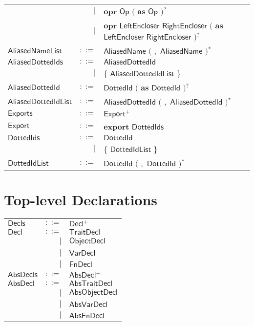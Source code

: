 \begin{longtable}[l]{p{3cm}rl}
 & $\big|$ &  $\mathbf{opr}$ $\mathsf{Op}$ $\big($  $\mathbf{as}$ $\mathsf{Op}$ $\big)$$^?$ \\
 & $\big|$ &  $\mathbf{opr}$ $\mathsf{LeftEncloser}$ $\mathsf{RightEncloser}$ $\big($  $\mathbf{as}$ $\mathsf{LeftEncloser}$ $\mathsf{RightEncloser}$ $\big)$$^?$ \\
$\mathsf{AliasedNameList}$ &  $\mathsf{::=}$  & $\mathsf{AliasedName}$ $\big($  $\mathbf{,}$ $\mathsf{AliasedName}$ $\big)$$^*$ \\
$\mathsf{AliasedDottedIds}$ &  $\mathsf{::=}$  & $\mathsf{AliasedDottedId}$ \\
 & $\big|$ &  $\mathbf{\{}$ $\mathsf{AliasedDottedIdList}$ $\mathbf{\}}$ \\
$\mathsf{AliasedDottedId}$ &  $\mathsf{::=}$  & $\mathsf{DottedId}$ $\big($  $\mathbf{as}$ $\mathsf{DottedId}$ $\big)$$^?$ \\
$\mathsf{AliasedDottedIdList}$ &  $\mathsf{::=}$  & $\mathsf{AliasedDottedId}$ $\big($  $\mathbf{,}$ $\mathsf{AliasedDottedId}$ $\big)$$^*$ \\
$\mathsf{Exports}$ &  $\mathsf{::=}$  & $\mathsf{Export}$$^+$ \\
$\mathsf{Export}$ &  $\mathsf{::=}$  & $\mathbf{export}$ $\mathsf{DottedIds}$ \\
$\mathsf{DottedIds}$ &  $\mathsf{::=}$  & $\mathsf{DottedId}$ \\
 & $\big|$ &  $\mathbf{\{}$ $\mathsf{DottedIdList}$ $\mathbf{\}}$ \\
$\mathsf{DottedIdList}$ &  $\mathsf{::=}$  & $\mathsf{DottedId}$ $\big($  $\mathbf{,}$ $\mathsf{DottedId}$ $\big)$$^*$ \\
\end{longtable} \hfill 

\section{Top-level Declarations} 

 
\begin{longtable}[l]{p{3cm}rl}
$\mathsf{Decls}$ &  $\mathsf{::=}$  & $\mathsf{Decl}$$^+$ \\
$\mathsf{Decl}$ &  $\mathsf{::=}$  & $\mathsf{TraitDecl}$ \\
 & $\big|$ &  $\mathsf{ObjectDecl}$ \\
 & $\big|$ &  $\mathsf{VarDecl}$ \\
 & $\big|$ &  $\mathsf{FnDecl}$ \\
$\mathsf{AbsDecls}$ &  $\mathsf{::=}$  & $\mathsf{AbsDecl}$$^+$ \\
$\mathsf{AbsDecl}$ &  $\mathsf{::=}$  & $\mathsf{AbsTraitDecl}$ \\
 & $\big|$ &  $\mathsf{AbsObjectDecl}$ \\
 & $\big|$ &  $\mathsf{AbsVarDecl}$ \\
 & $\big|$ &  $\mathsf{AbsFnDecl}$ \\
\end{longtable} \hfill 

